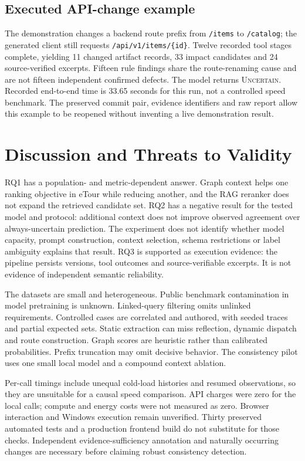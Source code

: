 \documentclass[conference,a4paper]{IEEEtran}
\newcommand{\uncertain}{\textsc{Uncertain}}
\begin{document}
\subsection{Executed API-change example}
The demonstration changes a backend route prefix from \texttt{/items} to \texttt{/catalog}; the generated client still requests \texttt{/api/v1/items/\{id\}}. Twelve recorded tool stages complete, yielding 11 changed artifact records, 33 impact candidates and 24 source-verified excerpts. Fifteen rule findings share the route-renaming cause and are not fifteen independent confirmed defects. The model returns \uncertain{}. Recorded end-to-end time is 33.65 seconds for this run, not a controlled speed benchmark. The preserved commit pair, evidence identifiers and raw report allow this example to be reopened without inventing a live demonstration result.

\section{Discussion and Threats to Validity}
RQ1 has a population- and metric-dependent answer. Graph context helps one ranking objective in eTour while reducing another, and the RAG reranker does not expand the retrieved candidate set. RQ2 has a negative result for the tested model and protocol: additional context does not improve observed agreement over always-uncertain prediction. The experiment does not identify whether model capacity, prompt construction, context selection, schema restrictions or label ambiguity explains that result. RQ3 is supported as execution evidence: the pipeline persists versions, tool outcomes and source-verifiable excerpts. It is not evidence of independent semantic reliability.

The datasets are small and heterogeneous. Public benchmark contamination in model pretraining is unknown. Linked-query filtering omits unlinked requirements. Controlled cases are correlated and authored, with seeded traces and partial expected sets. Static extraction can miss reflection, dynamic dispatch and route construction. Graph scores are heuristic rather than calibrated probabilities. Prefix truncation may omit decisive behavior. The consistency pilot uses one small local model and a compound context ablation.

Per-call timings include unequal cold-load histories and resumed observations, so they are unsuitable for a causal speed comparison. API charges were zero for the local calls; compute and energy costs were not measured as zero. Browser interaction and Windows execution remain unverified. Thirty preserved automated tests and a production frontend build do not substitute for those checks. Independent evidence-sufficiency annotation and naturally occurring changes are necessary before claiming robust consistency detection.
\end{document}
